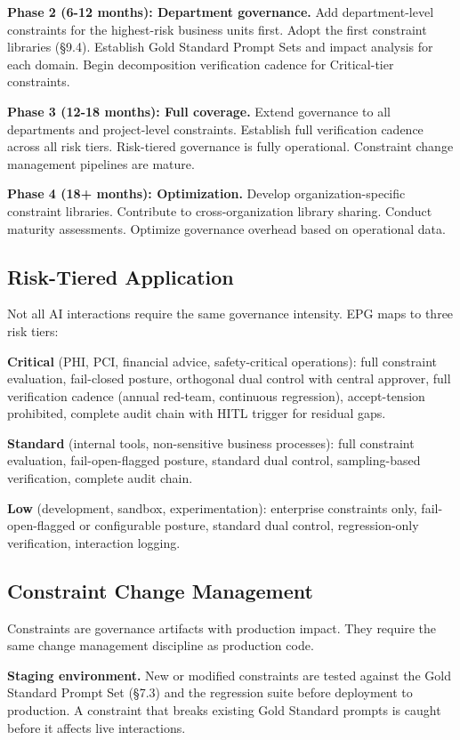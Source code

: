 \textbf{Phase 2 (6-12 months): Department governance.} Add department-level constraints for the highest-risk business units first. Adopt the first constraint libraries (\S{}9.4). Establish Gold Standard Prompt Sets and impact analysis for each domain. Begin decomposition verification cadence for Critical-tier constraints.

\textbf{Phase 3 (12-18 months): Full coverage.} Extend governance to all departments and project-level constraints. Establish full verification cadence across all risk tiers. Risk-tiered governance is fully operational. Constraint change management pipelines are mature.

\textbf{Phase 4 (18+ months): Optimization.} Develop organization-specific constraint libraries. Contribute to cross-organization library sharing. Conduct maturity assessments. Optimize governance overhead based on operational data.

\subsection{Risk-Tiered Application}


Not all AI interactions require the same governance intensity. EPG maps to three risk tiers:

\textbf{Critical} (PHI, PCI, financial advice, safety-critical operations): full constraint evaluation, fail-closed posture, orthogonal dual control with central approver, full verification cadence (annual red-team, continuous regression), accept-tension prohibited, complete audit chain with HITL trigger for residual gaps.

\textbf{Standard} (internal tools, non-sensitive business processes): full constraint evaluation, fail-open-flagged posture, standard dual control, sampling-based verification, complete audit chain.

\textbf{Low} (development, sandbox, experimentation): enterprise constraints only, fail-open-flagged or configurable posture, standard dual control, regression-only verification, interaction logging.

\subsection{Constraint Change Management}


Constraints are governance artifacts with production impact. They require the same change management discipline as production code.

\textbf{Staging environment.} New or modified constraints are tested against the Gold Standard Prompt Set (\S{}7.3) and the regression suite before deployment to production. A constraint that breaks existing Gold Standard prompts is caught before it affects live interactions.

